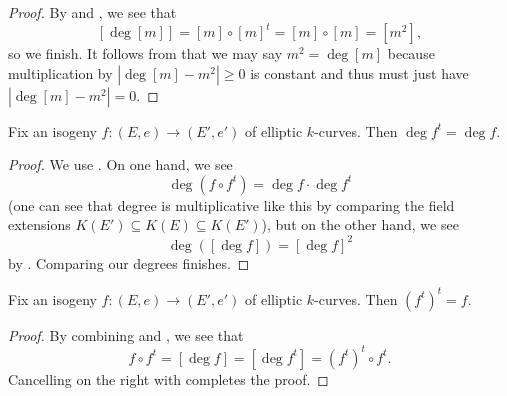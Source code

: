 \documentclass[../notes.tex]{subfiles}
\begin{document}
\begin{proof}
	By  and , we see that
	\[[\deg[m]]=[m]\circ[m]^t=[m]\circ[m]=\left[m^2\right],\]
	so we finish. It follows from  that we may say $m^2=\deg[m]$ because multiplication by $\left|\deg[m]-m^2\right|\ge0$ is constant and thus must just have $\left|\deg[m]-m^2\right|=0$.
\end{proof}
\begin{lemma} \label{lem:dual-degree}
	Fix an isogeny $f\colon(E,e)\to(E',e')$ of elliptic $k$-curves. Then $\deg f^t=\deg f$.
\end{lemma}
\begin{proof}
	We use . On one hand, we see
	\[\deg\left(f\circ f^t\right)=\deg f\cdot\deg f^t\]
	(one can see that degree is multiplicative like this by comparing the field extensions $K(E')\subseteq K(E)\subseteq K(E')$), but on the other hand, we see
	\[\deg\left([\deg f]\right)=[\deg f]^2\]
	by . Comparing our degrees finishes.
\end{proof}
\begin{proposition}
	Fix an isogeny $f\colon(E,e)\to(E',e')$ of elliptic $k$-curves. Then $\left(f^t\right)^t=f$.
\end{proposition}
\begin{proof}
	By combining  and , we see that
	\[f\circ f^t=[\deg f]=\left[\deg f^t\right]=\left(f^t\right)^t\circ f^t.\]
	Cancelling on the right with  completes the proof.
\end{proof}
\end{document}
